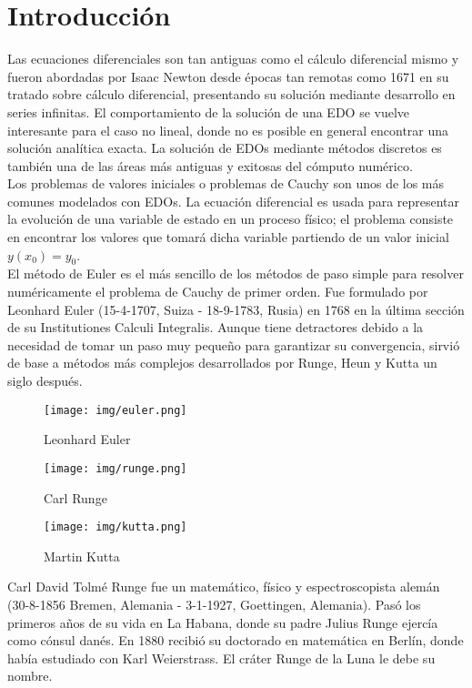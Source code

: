 \documentclass[a4paper,12pt]{article}
\begin{document}
\section{Introducción}
Las ecuaciones diferenciales son tan antiguas como el cálculo diferencial mismo y fueron abordadas por Isaac Newton desde épocas tan remotas como 1671 en su tratado sobre cálculo diferencial, presentando su solución mediante desarrollo en series infinitas. El comportamiento de la solución de una EDO se vuelve interesante para el caso no lineal, donde no es posible en general encontrar una solución analítica exacta. La solución de EDOs mediante métodos discretos es también una de las áreas más antiguas y exitosas del cómputo numérico.\\ Los problemas de valores iniciales o problemas de Cauchy son unos de los más comunes modelados con EDOs. La ecuación diferencial es usada para representar la evolución de una variable de estado en un proceso físico; el problema consiste en encontrar los valores que tomará dicha variable partiendo de un valor inicial \(y(x_0) = y_0\).\\ El método de Euler es el más sencillo de los métodos de paso simple para resolver numéricamente el problema de Cauchy de primer orden. Fue formulado por Leonhard Euler (15-4-1707, Suiza - 18-9-1783, Rusia) en 1768 en la última sección de su Institutiones Calculi Integralis. Aunque tiene detractores debido a la necesidad de tomar un paso muy pequeño para garantizar su convergencia, sirvió de base a métodos más complejos desarrollados por Runge, Heun y Kutta un siglo después.\\ 
\begin{figure}[h!]
    \centering
    \begin{minipage}[b]{0.3\textwidth} 
    \centering 
    \texttt{[image: img/euler.png]} \caption{Leonhard Euler} 
    \label{fig:imagen1} \end{minipage}
    \hfill 
    \begin{minipage}[b]{0.3\textwidth} 
    \centering 
    \texttt{[image: img/runge.png]} \caption{Carl Runge} 
    \label{fig:imagen2} \end{minipage} 
    \hfill 
     \begin{minipage}[b]{0.3\textwidth} 
    \centering 
    \texttt{[image: img/kutta.png]} \caption{Martin Kutta} 
    \label{fig:imagen3} 
    \end{minipage} 
\end{figure}
Carl David Tolmé Runge fue un matemático, físico y espectroscopista alemán (30-8-1856 Bremen, Alemania - 3-1-1927, Goettingen, Alemania). Pasó los primeros años de su vida en La Habana, donde su padre Julius Runge ejercía como cónsul danés. En 1880 recibió su doctorado en matemática en Berlín, donde había estudiado con Karl Weierstrass. El cráter Runge de la Luna le debe su nombre.\\
\end{document}
